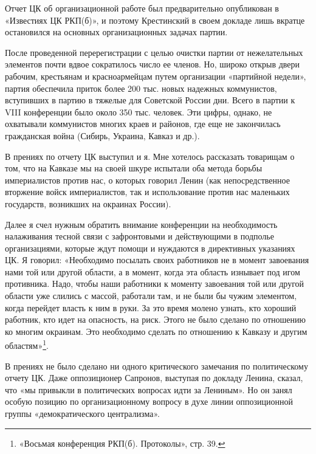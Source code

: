 \documentclass[12pt, a4paper, openany]{book}
\begin{document}
Отчет ЦК об организационной работе был предварительно опубликован в «Известиях ЦК РКП(б)», и поэтому Крестинский в своем докладе лишь вкратце остановился на основных организационных задачах партии.

После проведенной перерегистрации с целью очистки партии от нежелательных элементов почти вдвое сократилось число ее членов. Но, широко открыв двери рабочим, крестьянам и красноармейцам путем организации «партийной недели», партия обеспечила приток более 200 тыс. новых надежных коммунистов, вступивших в партию в тяжелые для Советской России дни. Всего в партии к VIII конференции было около 350 тыс. человек. Эти цифры, однако, не охватывали коммунистов многих краев и районов, где еще не закончилась гражданская война (Сибирь, Украина, Кавказ и др.).

В прениях по отчету ЦК выступил и я. Мне хотелось рассказать товарищам о том, что на Кавказе мы на своей шкуре испытали оба метода борьбы империалистов против нас, о которых говорил Ленин (как непосредственное вторжение войск империалистов, так и использование против нас маленьких государств, возникших на окраинах России).

Далее я счел нужным обратить внимание конференции на необходимость налаживания тесной связи с зафронтовыми и действующими в подполье организациями, которые ждут помощи и нуждаются в директивных указаниях ЦК. Я говорил: «Необходимо посылать своих работников не в момент завоевания нами той или другой области, а в момент, когда эта область изнывает под игом противника. Надо, чтобы наши работники к моменту завоевания той или другой области уже слились с массой, работали там, и не были бы чужим элементом, когда перейдет власть к ним в руки. За это время молено узнать, кто хороший работник, кто идет на опасность, на риск. Этого не было сделано по отношению ко многим окраинам. Это необходимо сделать по отношению к Кавказу и другим областям»\footnote{«Восьмая конференция РКП(б). Протоколы», стр. 39.}.

В прениях не было сделано ни одного критического замечания по политическому отчету ЦК. Даже оппозиционер Сапронов, выступая по докладу Ленина, сказал, что «мы привыкли в политических вопросах идти за Лениным». Но он занял особую позицию по организационному вопросу в духе линии оппозиционной группы «демократического централизма».
\end{document}
